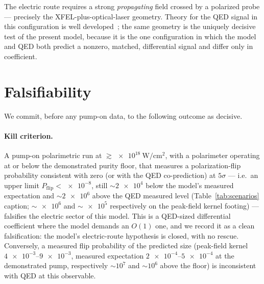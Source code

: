 \documentclass[aps,prd,twocolumn,superscriptaddress,nofootinbib,longbibliography]{revtex4-2}
\newcommand{\Pflip}{P_{\mathrm{flip}}}
\begin{document}
The electric route requires a strong \emph{propagating} field crossed by a
polarized probe --- precisely the XFEL-plus-optical-laser geometry. Theory for
the QED signal in this configuration is well
developed~\cite{Karbstein2015,BirefHibefLoI2025}; the same geometry is the
uniquely decisive test of the present model, because it is the one configuration
in which the model and QED both predict a nonzero, matched, differential signal
and differ only in coefficient.

\section{Falsifiability}
\label{sec:falsify}

We commit, before any pump-on data, to the following outcome as decisive.

\paragraph*{Kill criterion.}
A pump-on polarimetric run at
$\gtrsim\SI{e18}{\watt\per\centi\meter\squared}$, with a polarimeter operating
at or below the demonstrated purity floor, that measures a polarization-flip
probability consistent with zero (or with the QED co-prediction) at $5\sigma$ ---
i.e.\ an upper limit $\Pflip<\num{e-8}$, still $\sim\!\num{2e4}$ below the model's
measured expectation and $\sim\!\num{2e6}$ above the QED measured level
(Table~\ref{tab:scenarios} caption; $\sim\!\num{e6}$ and $\sim\!\num{e5}$
respectively on the peak-field kernel footing) --- falsifies the electric
sector of this model. This is a QED-sized differential coefficient where the model
demands an $O(1)$ one, and we record it as a clean falsification: the model's
electric-route hypothesis is closed, with no rescue. Conversely, a measured flip
probability of the predicted size (peak-field kernel $\numrange{4e-3}{9e-3}$,
measured expectation $\numrange{2e-4}{5e-4}$ at the demonstrated pump, respectively
$\sim\!10^7$ and $\sim\!10^6$ above the floor) is inconsistent with QED at
this observable.
\end{document}
